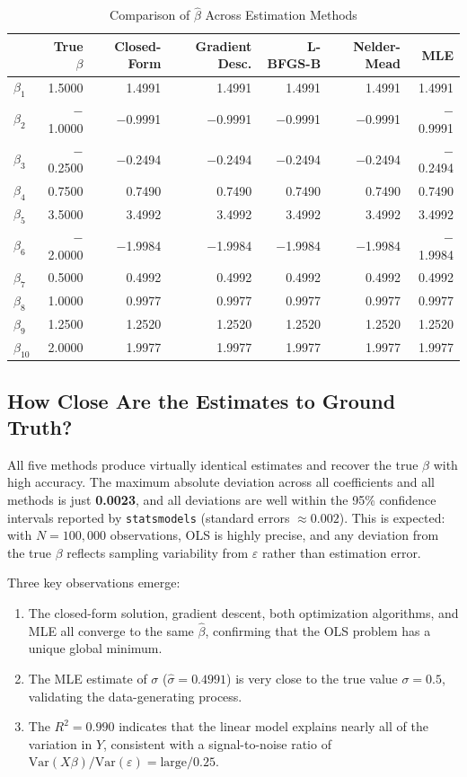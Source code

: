 \documentclass[12pt]{article}
\begin{document}
\begin{table}[ht]
\centering
\caption{Comparison of $\hat{\beta}$ Across Estimation Methods}
\label{tab:comparison}
\begin{tabular}{lrrrrrr}
\toprule
& True $\beta$ & Closed-Form & Gradient Desc. & L-BFGS-B & Nelder-Mead & MLE \\
\midrule
$\beta_1$  &  1.5000 &  1.4991 &  1.4991 &  1.4991 &  1.4991 &  1.4991 \\
$\beta_2$  & $-$1.0000 & $-$0.9991 & $-$0.9991 & $-$0.9991 & $-$0.9991 & $-$0.9991 \\
$\beta_3$  & $-$0.2500 & $-$0.2494 & $-$0.2494 & $-$0.2494 & $-$0.2494 & $-$0.2494 \\
$\beta_4$  &  0.7500 &  0.7490 &  0.7490 &  0.7490 &  0.7490 &  0.7490 \\
$\beta_5$  &  3.5000 &  3.4992 &  3.4992 &  3.4992 &  3.4992 &  3.4992 \\
$\beta_6$  & $-$2.0000 & $-$1.9984 & $-$1.9984 & $-$1.9984 & $-$1.9984 & $-$1.9984 \\
$\beta_7$  &  0.5000 &  0.4992 &  0.4992 &  0.4992 &  0.4992 &  0.4992 \\
$\beta_8$  &  1.0000 &  0.9977 &  0.9977 &  0.9977 &  0.9977 &  0.9977 \\
$\beta_9$  &  1.2500 &  1.2520 &  1.2520 &  1.2520 &  1.2520 &  1.2520 \\
$\beta_{10}$ &  2.0000 &  1.9977 &  1.9977 &  1.9977 &  1.9977 &  1.9977 \\
\bottomrule
\end{tabular}
\end{table}

\subsection*{How Close Are the Estimates to Ground Truth?}

All five methods produce virtually identical estimates and recover the true $\beta$ with high accuracy. The maximum absolute deviation across all coefficients and all methods is just \textbf{0.0023}, and all deviations are well within the 95\% confidence intervals reported by \texttt{statsmodels} (standard errors $\approx 0.002$). This is expected: with $N = 100{,}000$ observations, OLS is highly precise, and any deviation from the true $\beta$ reflects sampling variability from $\varepsilon$ rather than estimation error.

Three key observations emerge:
\begin{enumerate}
    \item The closed-form solution, gradient descent, both optimization algorithms, and MLE all converge to the same $\hat{\beta}$, confirming that the OLS problem has a unique global minimum.
    \item The MLE estimate of $\sigma$ ($\hat{\sigma} = 0.4991$) is very close to the true value $\sigma = 0.5$, validating the data-generating process.
    \item The $R^2 = 0.990$ indicates that the linear model explains nearly all of the variation in $Y$, consistent with a signal-to-noise ratio of $\text{Var}(X\beta)/\text{Var}(\varepsilon) = \text{large}/0.25$.
\end{enumerate}
\end{document}
